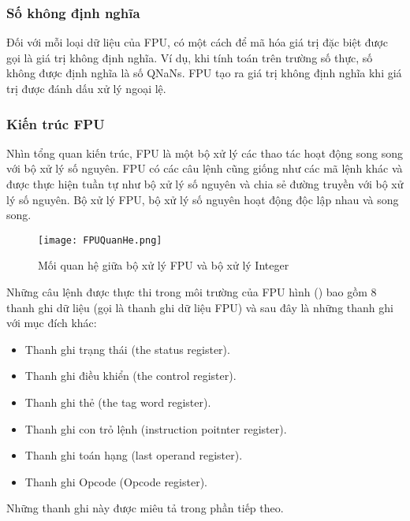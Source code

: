 		\subsubsection*{Số không định nghĩa}
		Đối với mỗi loại dữ liệu của FPU, có một cách để mã hóa giá trị đặc biệt được gọi là giá trị không định nghĩa. Ví dụ, khi tính toán trên trường số thực, số không được định nghĩa là số QNaNs. FPU tạo ra giá trị không định nghĩa khi giá trị được đánh dấu xử lý ngoại lệ.
		
		\subsubsection{Kiến trúc FPU}
		Nhìn tổng quan kiến trúc, FPU là một bộ xử lý các thao tác hoạt động song song với bộ xử lý số nguyên. FPU có các câu lệnh cũng giống như các mã lệnh khác và được thực hiện tuần tự như bộ xử lý số nguyên và chia sẻ đường truyền với bộ xử lý số nguyên. Bộ xử lý FPU, bộ xử lý số nguyên hoạt động độc lập nhau và song song. 
		
		\begin{center}
			\begin{figure}[htp]
				\begin{center}
					\texttt{[image: FPUQuanHe.png]}
				\end{center}
				\caption{Mối quan hệ giữa bộ xử lý FPU và bộ xử lý Integer}								
			\end{figure}
		\end{center}		
		
		Những câu lệnh được thực thi trong môi trường của FPU hình () bao gồm 8 thanh ghi dữ liệu (gọi là thanh ghi dữ liệu FPU) và sau đây là những thanh ghi với mục đích khác:
		\begin{itemize}
			\renewcommand{\labelitemi}{\textbullet}	
			\item	Thanh ghi trạng thái (the status register).
			\item	Thanh ghi điều khiển (the control register).
			\item	Thanh ghi thẻ (the tag word register).
			\item	Thanh ghi con trỏ lệnh (instruction poitnter register).
			\item	Thanh ghi toán hạng (last operand register).
			\item	Thanh ghi Opcode (Opcode register).
		\end{itemize}
		
	Những thanh ghi này được miêu tả trong phần tiếp theo.

